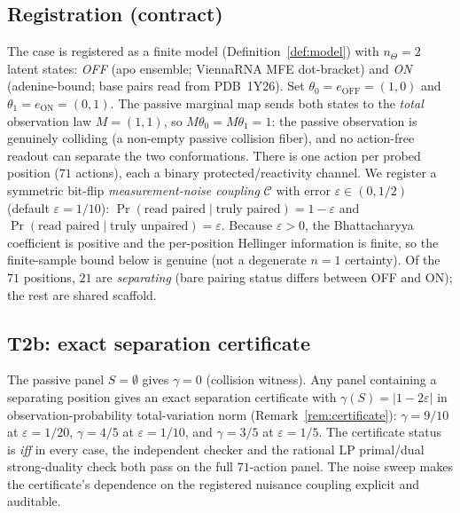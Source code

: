 \documentclass[11pt]{article}
\begin{document}
\subsection{Registration (contract)}
The case is registered as a finite model (Definition~\ref{def:model}) with $n_\Theta=2$ latent states:
\emph{OFF} (apo ensemble; ViennaRNA MFE dot-bracket) and \emph{ON} (adenine-bound; base pairs read from
PDB~1Y26). Set $\theta_0=e_{\mathrm{OFF}}=(1,0)$ and $\theta_1=e_{\mathrm{ON}}=(0,1)$. The passive
marginal map sends both states to the \emph{total} observation law $M=(1,1)$, so
$M\theta_0=M\theta_1=1$: the passive observation is genuinely colliding (a non-empty passive collision
fiber), and no action-free readout can separate the two conformations. There is one action per probed
position ($71$ actions), each a binary protected/reactivity channel. We register a symmetric
bit-flip \emph{measurement-noise coupling} $\mathcal{C}$ with error $\varepsilon\in(0,1/2)$
(default $\varepsilon=1/10$): $\Pr(\text{read paired}\mid\text{truly paired})=1-\varepsilon$ and
$\Pr(\text{read paired}\mid\text{truly unpaired})=\varepsilon$. Because $\varepsilon>0$, the
Bhattacharyya coefficient is positive and the per-position Hellinger information is finite, so the
finite-sample bound below is genuine (not a degenerate $n=1$ certainty). Of the $71$ positions,
$21$ are \emph{separating} (bare pairing status differs between OFF and ON); the rest are shared
scaffold.

\subsection{T2b: exact separation certificate}
The passive panel $S=\emptyset$ gives $\gamma=0$ (collision witness). Any panel containing a separating
position gives an exact separation certificate with $\gamma(S)=|1-2\varepsilon|$ in
observation-probability total-variation norm (Remark~\ref{rem:certificate}): $\gamma=9/10$ at $\varepsilon=1/20$,
$\gamma=4/5$ at $\varepsilon=1/10$, and $\gamma=3/5$ at $\varepsilon=1/5$. The certificate status is
\emph{iff} in every case, the independent checker and the rational LP primal/dual strong-duality check
both pass on the full $71$-action panel. The noise sweep makes the certificate's dependence on the
registered nuisance coupling explicit and auditable.
\end{document}
